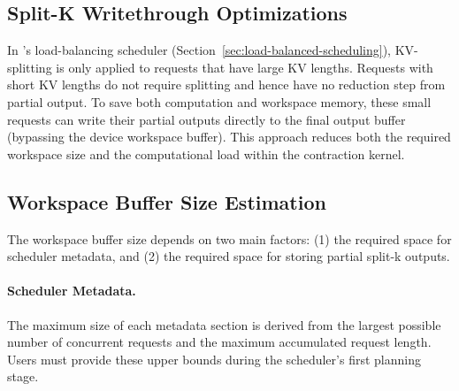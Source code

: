 \subsection{Split-K Writethrough Optimizations}
\label{sec:writethrough-optimizations}

In \sys's load-balancing scheduler (Section~\ref{sec:load-balanced-scheduling}), KV-splitting is only applied to requests that have large KV lengths. Requests with short KV lengths do not require splitting and hence have no reduction step from partial output. To save both computation and workspace memory, these small requests can write their partial outputs directly to the final output buffer (bypassing the device workspace buffer). This approach reduces both the required workspace size and the computational load within the contraction kernel.

\subsection{Workspace Buffer Size Estimation}
\label{sec:workspace-buffer-size}

The workspace buffer size depends on two main factors: 
(1) the required space for scheduler metadata, and 
(2) the required space for storing partial split-k outputs.

\paragraph{Scheduler Metadata.} The maximum size of each metadata section is derived from the largest possible number of concurrent requests and the maximum accumulated request length. Users must provide these upper bounds during the scheduler's first planning stage.

